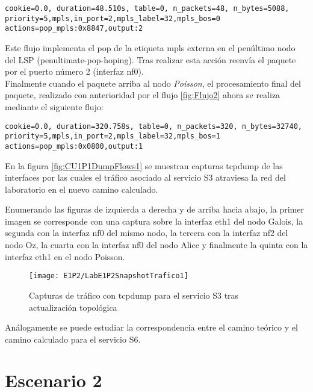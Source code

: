 \begin{center}
\texttt{cookie=0.0, duration=48.510s, table=0, n\_packets=48, n\_bytes=5088, 
priority=5,mpls,in\_port=2,mpls\_label=32,mpls\_bos=0 \\
actions=pop\_mpls:0x8847,output:2 }
\end{center}

Este flujo implementa el pop de la etiqueta mpls externa en el penúltimo nodo del LSP (penultimate-pop-hoping). Tras realizar esta acci\'on reenvía el paquete por el puerto n\'umero 2 (interfaz nf0).\\

Finalmente cuando el paquete arriba al nodo \textit{Poisson}, el procesamiento final del paquete, realizado con anterioridad por el flujo \ref{fig:Flujo2} ahora se realiza mediante el siguiente flujo: 

\begin{center}
\texttt{cookie=0.0, duration=320.758s, table=0, n\_packets=320, n\_bytes=32740, \\
priority=5,mpls,in\_port=2,mpls\_label=32,mpls\_bos=1 \\
actions=pop\_mpls:0x0800,output:1 }
\end{center}

En la figura \ref{fig:CU1P1DumpFlows1} se muestran capturas tcpdump de las interfaces por las cuales el tr\'afico asociado al servicio S3 atraviesa la red del laboratorio en el nuevo camino calculado.

Enumerando las figuras de izquierda a derecha y de arriba hacia abajo, la primer imagen se corresponde con una captura sobre la interfaz eth1 del nodo Galois, la segunda con la interfaz nf0 del mismo nodo, la tercera con la interfaz nf2 del nodo Oz, la cuarta con la interfaz nf0 del nodo Alice y finalmente la quinta con la interfaz eth1 en el nodo Poisson.

\newpage
\begin{figure}[ht!] 
\centering    
\texttt{[image: E1P2/LabE1P2SnapshotTrafico1]}
\caption[Capturas de tr\'afico con tcpdump para el servicio S3 tras actualización topol\'ogica]{Capturas de tr\'afico con tcpdump para el servicio S3 tras actualización topol\'ogica}
\label{fig:LabE1P1CapsTraf3}
\end{figure}

Análogamente se puede estudiar la correspondencia entre el camino te\'orico y el camino calculado para el servicio S6.\\

\section{Escenario 2}
\label{appendix6.4}


